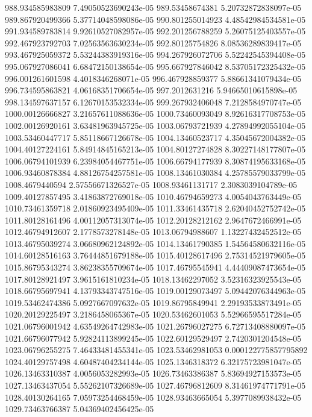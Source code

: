 {988.934585983809 7.49050523690243e-05
989.53458674381 5.20732872838097e-05
989.867920499366 5.37714048598086e-05
990.801255014923 4.48542984534581e-05
991.934589783814 9.92610527082957e-05
992.201256788259 5.26075125403557e-05
992.467923792703 7.02563563630234e-05
992.80125754826 8.08536289839417e-05
993.467925059372 5.53244383919316e-05
994.267926072706 5.52242545394408e-05
995.067927086041 6.68472150138654e-05
995.667927846042 8.53705172325432e-05
996.001261601598 4.4018346268071e-05
996.467928859377 5.88661341079434e-05
996.734595863821 4.06168351706654e-05
997.2012631216 5.94665010615898e-05
998.134597637157 6.12670153532334e-05
999.267932406048 7.2128584970747e-05
1000.00126666827 3.21657611088636e-05
1000.73460093049 8.92616317708753e-05
1002.00126920161 3.63481963945725e-05
1003.06793721939 4.27894992055104e-05
1003.53460447717 5.85118667126678e-05
1004.13460523717 4.35045672004382e-05
1004.40127224161 5.84914845165213e-05
1004.80127274828 8.30227148177807e-05
1006.06794101939 6.23984054467751e-05
1006.66794177939 8.30874195633168e-05
1006.93460878384 4.88126754257581e-05
1008.13461030384 4.25785579033799e-05
1008.4679440594 2.57556671326527e-05
1008.93461131717 2.3083039104789e-05
1009.40127857495 3.41863872769018e-05
1010.46794659273 4.0054043763449e-05
1010.73461359718 2.01860923495409e-05
1011.33461435718 2.62040452752742e-05
1011.80128161496 4.00112057313074e-05
1012.20128212162 2.9647672466991e-05
1012.46794912607 2.1778573278148e-05
1013.06794988607 1.13227432452512e-05
1013.46795039274 3.06680962124892e-05
1014.13461790385 1.54564580632116e-05
1014.60128516163 3.76444851679188e-05
1015.40128617496 2.75314521979605e-05
1015.86795343274 3.86238355709674e-05
1017.46795545941 4.44409087473654e-05
1017.80128921497 3.9615161810234e-05
1018.13462297052 3.52316323925543e-05
1018.66795697941 4.13793343747516e-05
1019.00129073497 5.09442076344963e-05
1019.53462474386 5.0927667097632e-05
1019.86795849941 2.29193533873491e-05
1020.20129225497 3.2186458065367e-05
1020.53462601053 5.52966595517284e-05
1021.06796001942 4.63549264742983e-05
1021.26796027275 6.72713408880097e-05
1021.66796077942 5.92824113899245e-05
1022.60129529497 2.7420301204548e-05
1023.06796255275 7.46433481455341e-05
1023.53462981053 0.000122775857795892
1024.40129757498 4.60487404234144e-05
1025.1346318372 6.32175723981047e-05
1026.13463310387 4.0056053282993e-05
1026.73463386387 5.83694927153573e-05
1027.13463437054 5.55262107326689e-05
1027.46796812609 8.31461974771791e-05
1028.40130264165 7.05973254468459e-05
1028.93463665054 5.3977089938432e-05
1029.73463766387 5.04369402456425e-05
}
